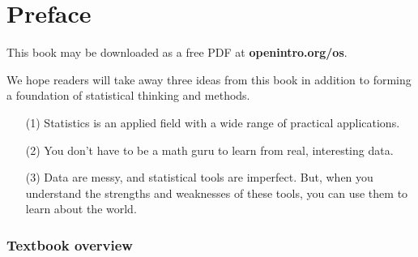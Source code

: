 \chapter{Preface}

This book may be downloaded as a free PDF at
    {\color{black}\textbf{openintro.org/os}}. \vspace{3mm}

\noindent We hope readers will take away three ideas from
this book in addition to forming a foundation of statistical
thinking and methods.\vspace{-1mm}
\begin{enumerate}
\setlength{\itemsep}{0mm}
\item[(1)] Statistics is an applied field with a wide range
    of practical applications.
\item[(2)] You don't have to be a math guru to learn
    from real, interesting data.
\item[(3)] Data are messy, and statistical tools are imperfect.
    But, when you understand the strengths and weaknesses of
    these tools, you can use them to learn about the world.
\end{enumerate}


\subsection*{Textbook overview}


